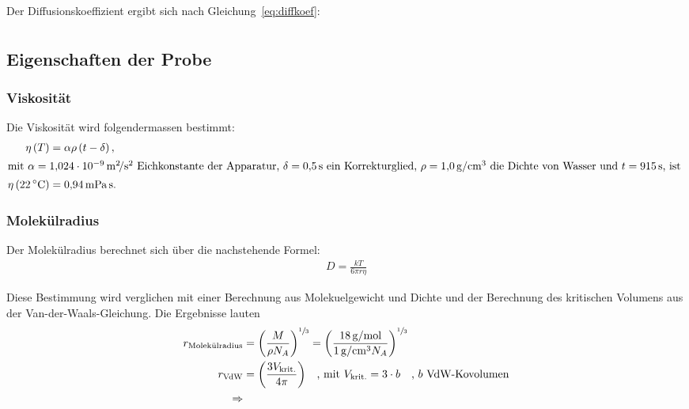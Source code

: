 Der Diffusionskoeffizient ergibt sich nach Gleichung~\eqref{eq:diffkoef}:
\begin{align}%
  \label{eq:d}
  
\end{align}


\subsection{Eigenschaften der Probe}%
\label{sec:eigenschaften_der_probe}

\subsubsection{Viskosität}%
\label{sub:viskositaet}

Die Viskosität wird folgendermassen bestimmt:
\begin{align}
  \nonumber
  \eta \left(T\right) &= \alpha \rho \left(t - \delta\right), \\
  \intertext{%
    mit $\alpha = \SI[]{1.024e-09}{\meter\squared\per\second\squared}$ Eichkonstante der Apparatur,
    $\delta = \SI[]{0.5}{\second}$ ein Korrekturglied,
    $\rho = \SI[]{1.0}{\gram\per\centi\meter\cubed}$ die Dichte von Wasser
    und $t = \SI{915}{\second}$, ist
  }
  \label{eq:viskositaet}
  \eta \left(\SI{22}{\celsius}\right)&= \SI[]{0.94}{\milli\pascal\second}.
\end{align}

\subsubsection{Molekülradius}%
\label{sub:molekuelradius}
Der Molekülradius berechnet sich über die nachstehende Formel:
\begin{align}
  \label{eq:molekuelradius}
  D = \frac{k T}{6 \pi r \eta}
\end{align}

Diese Bestimmung wird verglichen mit einer Berechnung aus Molekuelgewicht und Dichte
und der Berechnung des kritischen Volumens aus der Van-der-Waals-Gleichung.
Die Ergebnisse lauten
\begin{align*}
  r_\text{Molekülradius} &= {\left(\frac{M}{\rho N_A}\right)}^{\sfrac{1}{3}} =
    {\left(\frac{\SI{18}{\gram\per\mole}}{\SI{1}{\gram\per\centi\meter\tothe3} N_A}\right)}^{\sfrac{1}{3}} \\
    r_\text{VdW} &= {\left(\frac{3 V_\text{krit.}}{4 \pi}\right)}
    \hspace{1em}\text{, mit } V_\text{krit.} = 3 \cdot b \hspace{1em}\text{, $b$ VdW-Kovolumen}\\
  \Rightarrow 
\end{align*}

